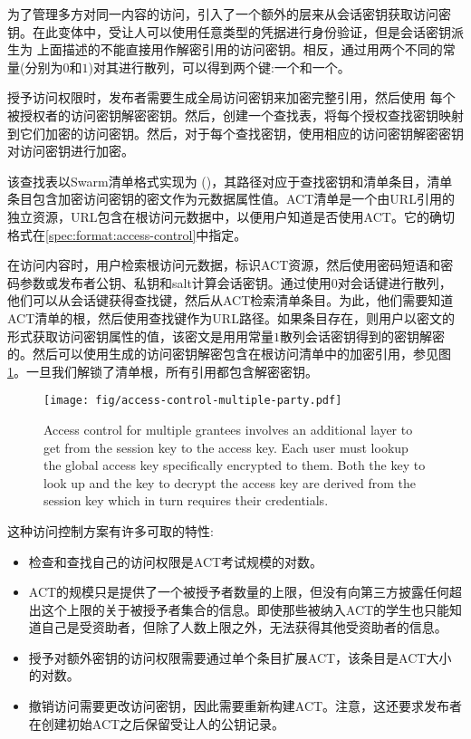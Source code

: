 为了管理多方对同一内容的访问，引入了一个额外的层来从会话密钥获取访问密钥。在此变体中，受让人可以使用任意类型的凭据进行身份验证，但是会话密钥派生为
上面描述的不能直接用作解密引用的访问密钥。相反，通过用两个不同的常量(分别为$0$和$1$)对其进行散列，可以得到两个键:一个和一个。

授予访问权限时，发布者需要生成全局访问密钥来加密完整引用，然后使用
每个被授权者的访问密钥解密密钥。然后，创建一个查找表，将每个授权查找密钥映射到它们加密的访问密钥。然后，对于每个查找密钥，使用相应的访问密钥解密密钥对访问密钥进行加密。

该查找表以Swarm清单格式实现为 ()，其路径对应于查找密钥和清单条目，清单条目包含加密访问密钥的密文作为元数据属性值。ACT清单是一个由URL引用的独立资源，URL包含在根访问元数据中，以便用户知道是否使用ACT。它的确切格式在\ref{spec:format:access-control}中指定。

在访问内容时，用户检索根访问元数据，标识ACT资源，然后使用密码短语和密码参数或发布者公钥、私钥和salt计算会话密钥。通过使用$0$对会话键进行散列，他们可以从会话键获得查找键，然后从ACT检索清单条目。为此，他们需要知道ACT清单的根，然后使用查找键作为URL路径。如果条目存在，则用户以密文的形式获取访问密钥属性的值，该密文是用用常量$1$散列会话密钥得到的密钥解密的。然后可以使用生成的访问密钥解密包含在根访问清单中的加密引用，参见图\ref{fig:access-control-multiple-party}。一旦我们解锁了清单根，所有引用都包含解密密钥。

\begin{figure}[htbp]
\centering
\texttt{[image: fig/access-control-multiple-party.pdf]}
\caption[Access control for multiple grantees \statusyellow]{Access control for multiple grantees involves an additional layer to get from the session key to the access key. Each user must lookup the global access key specifically encrypted to them. Both the key to look up and the key to decrypt the access key are derived from the session key which in turn requires their credentials.} 
\label{fig:access-control-multiple-party}
\end{figure}


这种访问控制方案有许多可取的特性:
\begin{itemize}
\item 检查和查找自己的访问权限是ACT考试规模的对数。
\item ACT的规模只是提供了一个被授予者数量的上限，但没有向第三方披露任何超出这个上限的关于被授予者集合的信息。即使那些被纳入ACT的学生也只能知道自己是受资助者，但除了人数上限之外，无法获得其他受资助者的信息。
\item 授予对额外密钥的访问权限需要通过单个条目扩展ACT，该条目是ACT大小的对数。 
\item 撤销访问需要更改访问密钥，因此需要重新构建ACT。注意，这还要求发布者在创建初始ACT之后保留受让人的公钥记录。
\end{itemize}

